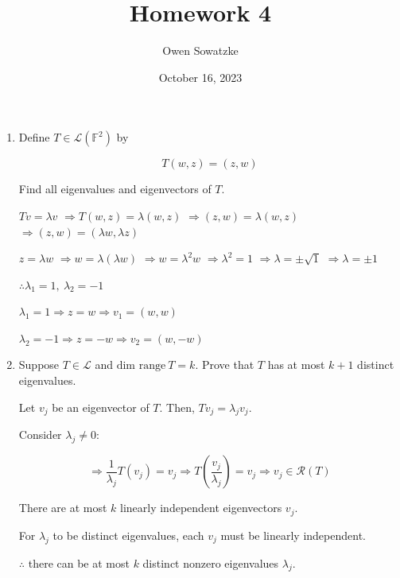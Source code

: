 \documentclass[fleqn]{article}
\title{Homework 4}
\author{Owen Sowatzke}
\date{October 16, 2023}
\makeatletter
\newcommand{\zerodisplayskip}{
	\setlength{\abovedisplayskip}{0pt}%
	\setlength{\belowdisplayskip}{0pt}%
	\setlength{\abovedisplayshortskip}{0pt}%
	\setlength{\belowdisplayshortskip}{0pt}%
	\setlength{\mathindent}{0pt}}
\newenvironment{equationCenter}{\@fleqnfalse\begin{equation*}}{\end{equation*}}
\makeatother
\begin{document}
	\offinterlineskip
	\setlength{\lineskip}{12pt}
	\zerodisplayskip
	\maketitle
	
	\begin{enumerate}[nolistsep]
		\item Define $T \in \mathcal{L}(\mathbb{F}^2)$ by
		
			\begin{equationCenter}
				T(w,z) = (z,w)
			\end{equationCenter}
			
			Find all eigenvalues and eigenvectors of $T$.
	
			$Tv = {\lambda}v$
			$\Rightarrow T(w,z) = \lambda(w,z)$
			$\Rightarrow(z,w) = \lambda(w,z)$
			$\Rightarrow(z,w) = ({\lambda}w,{\lambda}z)$
			
			$z = {\lambda}w$
			$\Rightarrow w = \lambda({\lambda}w)$
			$\Rightarrow w = {\lambda}^2 w$
			$\Rightarrow {\lambda}^2 = 1$
			$\Rightarrow \lambda = \pm \sqrt{1}$
			$\Rightarrow \lambda = \pm 1$
			
			$\therefore \lambda_1 = 1,\ \lambda_2 = -1$
			
			$\lambda_1 = 1 \Rightarrow z = w \Rightarrow v_1 = (w, w)$
			
			$\lambda_2 = -1 \Rightarrow z = -w \Rightarrow v_2 = (w, -w)$
			
		\item Suppose $T \in \mathcal{L}$ and $\text{dim range}\ T = k$. Prove that $T$ has at most $k + 1$ distinct eigenvalues.
	
			Let $v_j$ be an eigenvector of $T$. Then, $Tv_j = {\lambda_j}v_j$.
			
			Consider $\lambda_j \neq 0$:
			
			\begin{equation*}
				\Rightarrow \frac{1}{\lambda_j}T(v_j) = v_j \Rightarrow T\left(\frac{v_j}{\lambda_j}\right) = v_j	 \Rightarrow v_j \in \mathcal{R}(T)			
			\end{equation*}
			
			There are at most $k$ linearly independent eigenvectors $v_j$.
			
			For $\lambda_j$ to be distinct eigenvalues, each $v_j$ must be linearly independent.
			
			$\therefore$ there can be at most $k$ distinct nonzero eigenvalues $\lambda_j$.
			

\end{enumerate}
\end{document}
